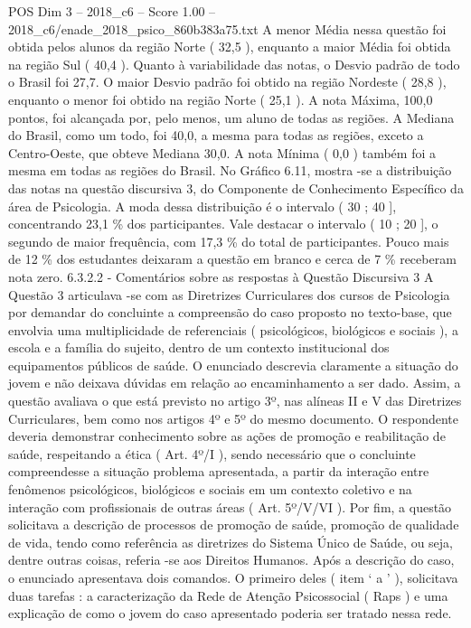 \begin{textsample}{POS Dim 3 – 2018\_c6 – Score 1.00 – 2018\_c6/enade\_2018\_psico\_860b383a75.txt}
A menor Média nessa questão foi obtida pelos alunos da região Norte ( 32,5 ), enquanto a maior Média foi obtida na região Sul ( 40,4 ).
Quanto à variabilidade das notas, o Desvio padrão de todo o Brasil foi 27,7.
O maior Desvio padrão foi obtido na região Nordeste ( 28,8 ), enquanto o menor foi obtido na região Norte ( 25,1 ).
A nota Máxima, 100,0 pontos, foi alcançada por, pelo menos, um aluno de todas as regiões.
A Mediana do Brasil, como um todo, foi 40,0, a mesma para todas as regiões, exceto a Centro-Oeste, que obteve Mediana 30,0.
A nota Mínima ( 0,0 ) também foi a mesma em todas as regiões do Brasil.
No Gráfico 6.11, mostra -se a distribuição das notas na questão discursiva 3, do Componente de Conhecimento Específico da área de Psicologia.
A moda dessa distribuição é o intervalo ( 30 ; 40 ], concentrando 23,1 \% dos participantes.
Vale destacar o intervalo ( 10 ; 20 ], o segundo de maior frequência, com 17,3 \% do total de participantes.
Pouco mais de 12 \% dos estudantes deixaram a questão em branco e cerca de 7 \% receberam nota zero. 6.3.2.2 - Comentários sobre as respostas à Questão Discursiva 3 A Questão 3 articulava -se com as Diretrizes Curriculares dos cursos de Psicologia por demandar do concluinte a compreensão do caso proposto no texto-base, que envolvia uma multiplicidade de referenciais ( psicológicos, biológicos e sociais ), a escola e a família do sujeito, dentro de um contexto institucional dos equipamentos públicos de saúde.
O enunciado descrevia claramente a situação do jovem e não deixava dúvidas em relação ao encaminhamento a ser dado.
Assim, a questão avaliava o que está previsto no artigo 3º, nas alíneas II e V das Diretrizes Curriculares, bem como nos artigos 4º e 5º do mesmo documento.
O respondente deveria demonstrar conhecimento sobre as ações de promoção e reabilitação de saúde, respeitando a ética ( Art. 4º/I ), sendo necessário que o concluinte compreendesse a situação problema apresentada, a partir da interação entre fenômenos psicológicos, biológicos e sociais em um contexto coletivo e na interação com profissionais de outras áreas ( Art. 5º/V/VI ).
Por fim, a questão solicitava a descrição de processos de promoção de saúde, promoção de qualidade de vida, tendo como referência as diretrizes do Sistema Único de Saúde, ou seja, dentre outras coisas, referia -se aos Direitos Humanos.
Após a descrição do caso, o enunciado apresentava dois comandos.
O primeiro deles ( item ‘ a ’ ), solicitava duas tarefas : a caracterização da Rede de Atenção Psicossocial ( Raps ) e uma explicação de como o jovem do caso apresentado poderia ser tratado nessa rede.

\end{textsample}
